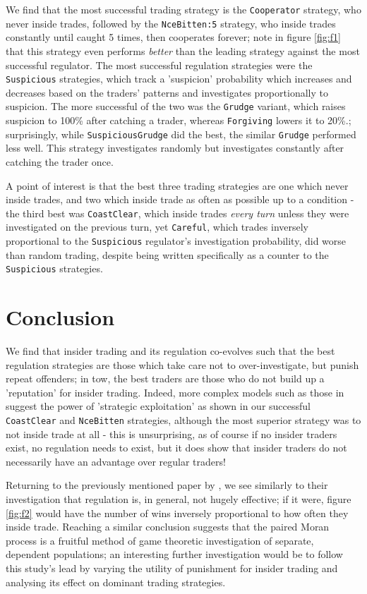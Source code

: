 \documentclass{article}
\begin{document}
We find that the most successful trading strategy is the \texttt{Cooperator} strategy, who never inside trades, followed by the \texttt{NceBitten:5} strategy, who inside trades constantly until caught 5 times, then cooperates forever; note in figure \ref{fig:f1} that this strategy even performs \emph{better} than the leading strategy against the most successful regulator. The most successful regulation strategies were the \texttt{Suspicious} strategies, which track a 'suspicion' probability which increases and decreases based on the traders' patterns and investigates proportionally to suspicion. The more successful of the two was the \texttt{Grudge} variant, which raises suspicion to 100\% after catching a trader, whereas \texttt{Forgiving} lowers it to 20\%.; surprisingly, while \texttt{SuspiciousGrudge} did the best, the similar \texttt{Grudge} performed less well. This strategy investigates randomly but investigates constantly after catching the trader once.

A point of interest is that the best three trading strategies are one which never inside trades, and two which inside trade as often as possible up to a condition - the third best was \texttt{CoastClear}, which inside trades \emph{every turn} unless they were investigated on the previous turn, yet \texttt{Careful}, which trades inversely proportional to the \texttt{Suspicious} regulator's investigation probability, did worse than random trading, despite being written specifically as a counter to the \texttt{Suspicious} strategies.

\section{Conclusion}
We find that insider trading and its regulation co-evolves such that the best regulation strategies are those which take care not to over-investigate, but punish repeat offenders; in tow, the best traders are those who do not build up a 'reputation' for insider trading. Indeed, more complex models such as those in \citet{kyle1985continuous} suggest the power of 'strategic exploitation' as shown in our successful \texttt{CoastClear} and \texttt{NceBitten} strategies, although the most superior strategy was to not inside trade at all - this is unsurprising, as of course if no insider traders exist, no regulation needs to exist, but it does show that insider traders do not necessarily have an advantage over regular traders!

Returning to the previously mentioned paper by \citet{smales2017game}, we see similarly to their investigation that regulation is, in general, not hugely effective; if it were, figure \ref{fig:f2} would have the number of wins inversely proportional to how often they inside trade. Reaching a similar conclusion suggests that the paired Moran process is a fruitful method of game theoretic investigation of separate, dependent populations; an interesting further investigation would be to follow this study's lead by varying the utility of punishment for insider trading and analysing its effect on dominant trading strategies.

\end{document}
